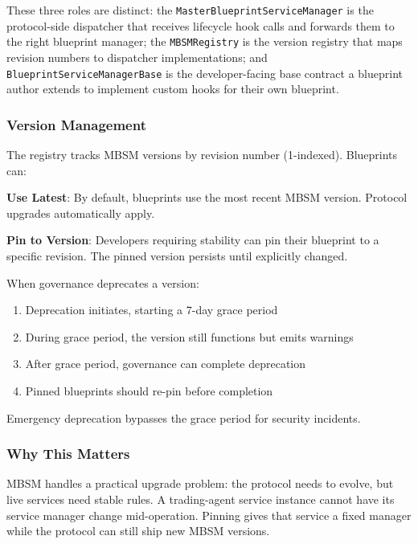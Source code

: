 \documentclass[11pt,a4paper]{article}
\begin{document}
These three roles are distinct: the \texttt{MasterBlueprintServiceManager} is the protocol-side dispatcher that receives lifecycle hook calls and forwards them to the right blueprint manager; the \texttt{MBSMRegistry} is the version registry that maps revision numbers to dispatcher implementations; and \texttt{BlueprintServiceManagerBase} is the developer-facing base contract a blueprint author extends to implement custom hooks for their own blueprint.

\subsubsection{Version Management}

The registry tracks MBSM versions by revision number (1-indexed). Blueprints can:

\textbf{Use Latest}: By default, blueprints use the most recent MBSM version. Protocol upgrades automatically apply.

\textbf{Pin to Version}: Developers requiring stability can pin their blueprint to a specific revision. The pinned version persists until explicitly changed.

When governance deprecates a version:
\begin{enumerate}[noitemsep]
    \item Deprecation initiates, starting a 7-day grace period
    \item During grace period, the version still functions but emits warnings
    \item After grace period, governance can complete deprecation
    \item Pinned blueprints should re-pin before completion
\end{enumerate}

Emergency deprecation bypasses the grace period for security incidents.

\subsubsection{Why This Matters}

MBSM handles a practical upgrade problem: the protocol needs to evolve, but live services need stable rules. A trading-agent service instance cannot have its service manager change mid-operation. Pinning gives that service a fixed manager while the protocol can still ship new MBSM versions.

\end{document}
